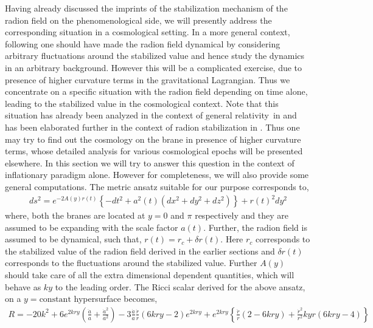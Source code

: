 \documentclass{article}
\def\gr{general relativity}
\begin{document}
Having already discussed the imprints of the stabilization mechanism of the radion field on the phenomenological side, we will presently address the corresponding situation in a cosmological setting. In a more general context, following \cite{Goldberger:1999wh} one should have made the radion field dynamical by considering arbitrary fluctuations around the stabilized value and hence study the dynamics in an arbitrary background. However this will be a complicated exercise, due to presence of higher curvature terms in the gravitational Lagrangian. Thus we concentrate on a specific situation with the radion field depending on time alone, leading to the stabilized value in the cosmological context. Note that this situation has already been analyzed in the context of \gr\ in \cite{Csaki:1999mp} and has been elaborated further in the context of radion stabilization in \cite{Chakraborty:2013ipa}. Thus one may try to find out the cosmology on the brane in presence of higher curvature terms, whose detailed analysis for various cosmological epochs will be presented elsewhere. In this section we will try to answer this question in the context of inflationary paradigm alone. However for completeness, we will also provide some general computations. The metric ansatz suitable for our purpose corresponds to,
\begin{align}
ds^{2}=e^{-2A(y)r(t)}\left\{-dt^{2}+a^{2}(t)\left(dx^{2}+dy^{2}+dz^{2}\right) \right\}+r(t)^{2}dy^{2}
\end{align}
where, both the branes are located at $y=0$ and $\pi$ respectively and they are assumed to be expanding with the scale factor $a(t)$. Further, the radion field is assumed to be dynamical, such that, $r(t)=r_{c}+\delta r(t)$. Here $r_{c}$ corresponds to the stabilized value of the radion field derived in the earlier sections and $\delta r(t)$ corresponds to the fluctuations around the stabilized value. Further $A(y)$ should take care of all the extra dimensional dependent quantities, which will behave as $ky$ to the leading order. The Ricci scalar derived for the above ansatz, on a $y=\textrm{constant}$ hypersurface becomes,
\begin{align}
R=-20k^{2}+6e^{2kry}\left(\frac{\ddot{a}}{a}+\frac{\dot{a}^{2}}{a^{2}} \right)-3\frac{\dot{a}}{a}\frac{\dot{r}}{r}\left(6kry-2\right)e^{2kry}
+e^{2kry}\left\{\frac{\ddot{r}}{r}\left(2-6kry \right)+\frac{\dot{r}^{2}}{r^{2}}kyr\left(6kry-4 \right) \right\}
\end{align}
\end{document}
